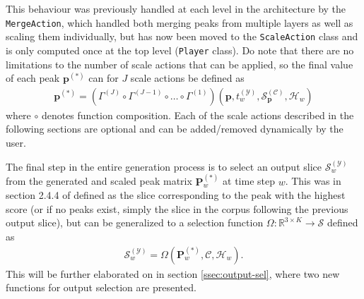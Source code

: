	
This behaviour was previously handled at each level in the architecture by the \texttt{MergeAction}, which handled both merging peaks from multiple layers as well as scaling them individually, but has now been moved to the \texttt{ScaleAction} class and is only computed once at the top level (\texttt{Player} class). Do note that there are no limitations to the number of scale actions that can be applied, so the final value of each peak $\bm  p^{(\ast)}$ can for $J$ scale actions be defined as
	\begin{align}
		\bm p^{(\ast)} = \left(\Gamma^{(J)} \circ \Gamma^{(J-1)} \circ \dots \circ \Gamma^{(1)} \right)\left(\bm p, t^{(\mathcal Y)}_w, \mathcal S^{(\mathcal C)}_{\bm p}, \mathcal H_w\right)
	\end{align}
	where $\circ$ denotes function composition. Each of the scale actions described in the following sections are optional and can be added/removed dynamically by the user.
		
The final step in the entire generation process is to select an output slice $\mathcal S^{(\mathcal Y)}_w$ from the generated and scaled peak matrix $\bm P^{(\ast)}_w$ at time step $w$. This was in section 2.4.4 of \cite{borg2020dynamic} defined as the slice corresponding to the peak with the highest score (or if no peaks exist, simply the slice in the corpus following the previous output slice), but can be generalized to a selection function $\Omega \colon \mathbb R^{3\times K} \rightarrow \mathcal S$ defined as
	\begin{align}\label{eq:outputsel}
		\mathcal S^{(\mathcal Y)}_w = \Omega\left(\bm P^{(\ast)}_w, \mathcal C, \mathcal H_w \right).
	\end{align}
	This will be further elaborated on in section \ref{ssec:output-sel}, where two new functions for output selection are presented.

